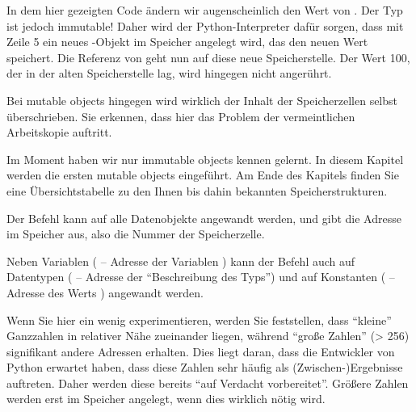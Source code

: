 In dem hier gezeigten Code ändern wir augenscheinlich den Wert von . Der Typ  ist jedoch immutable! Daher wird der Python-Interpreter dafür sorgen, dass mit Zeile 5 ein neues -Objekt im Speicher angelegt wird, das den neuen Wert speichert. Die Referenz von  geht nun auf diese neue Speicherstelle. Der Wert 100, der in der alten Speicherstelle lag, wird hingegen nicht angerührt.

Bei mutable objects hingegen wird wirklich der Inhalt der Speicherzellen selbst überschrieben. Sie erkennen, dass hier das Problem der vermeintlichen Arbeitskopie auftritt.

Im Moment haben wir nur immutable objects kennen gelernt. In diesem Kapitel werden die ersten mutable objects eingeführt. Am Ende des Kapitels finden Sie eine Übersichtstabelle zu den Ihnen bis dahin bekannten Speicherstrukturen.

\begin{hintbox}
Der Befehl  kann auf alle Datenobjekte angewandt werden, und gibt die Adresse im Speicher aus, also die Nummer der Speicherzelle.

Neben Variablen ( -- Adresse der Variablen ) kann der Befehl auch auf Datentypen ( -- Adresse der \enquote{Beschreibung des Typs}) und auf Konstanten ( -- Adresse des Werts ) angewandt werden.

Wenn Sie hier ein wenig experimentieren, werden Sie feststellen, dass \enquote{kleine} Ganzzahlen in relativer Nähe zueinander liegen, während \enquote{große Zahlen} (> 256) signifikant andere Adressen erhalten. Dies liegt daran, dass die Entwickler von Python erwartet haben, dass diese Zahlen sehr häufig als (Zwischen-)Ergebnisse auftreten. Daher werden diese bereits \enquote{auf Verdacht vorbereitet}. Größere Zahlen werden erst im Speicher angelegt, wenn dies wirklich nötig wird.
\end{hintbox}

